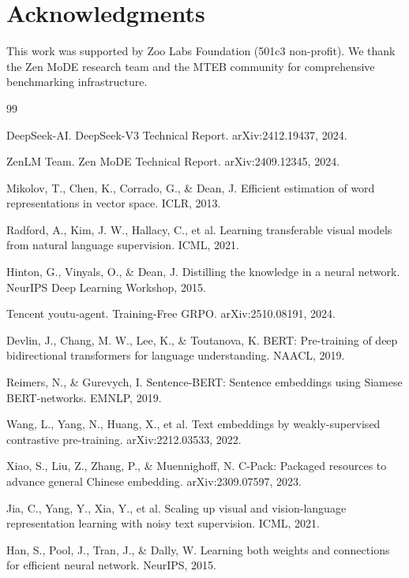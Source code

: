 \documentclass[11pt,letterpaper]{article}
\begin{document}
\section*{Acknowledgments}

This work was supported by Zoo Labs Foundation (501c3 non-profit). We thank the Zen MoDE research team and the MTEB community for comprehensive benchmarking infrastructure.

\begin{thebibliography}{99}

DeepSeek-AI. DeepSeek-V3 Technical Report. arXiv:2412.19437, 2024.

ZenLM Team. Zen MoDE Technical Report. arXiv:2409.12345, 2024.

Mikolov, T., Chen, K., Corrado, G., \& Dean, J. Efficient estimation of word representations in vector space. ICLR, 2013.

Radford, A., Kim, J. W., Hallacy, C., et al. Learning transferable visual models from natural language supervision. ICML, 2021.

Hinton, G., Vinyals, O., \& Dean, J. Distilling the knowledge in a neural network. NeurIPS Deep Learning Workshop, 2015.

Tencent youtu-agent. Training-Free GRPO. arXiv:2510.08191, 2024.

Devlin, J., Chang, M. W., Lee, K., \& Toutanova, K. BERT: Pre-training of deep bidirectional transformers for language understanding. NAACL, 2019.

Reimers, N., \& Gurevych, I. Sentence-BERT: Sentence embeddings using Siamese BERT-networks. EMNLP, 2019.

Wang, L., Yang, N., Huang, X., et al. Text embeddings by weakly-supervised contrastive pre-training. arXiv:2212.03533, 2022.

Xiao, S., Liu, Z., Zhang, P., \& Muennighoff, N. C-Pack: Packaged resources to advance general Chinese embedding. arXiv:2309.07597, 2023.

Jia, C., Yang, Y., Xia, Y., et al. Scaling up visual and vision-language representation learning with noisy text supervision. ICML, 2021.

Han, S., Pool, J., Tran, J., \& Dally, W. Learning both weights and connections for efficient neural network. NeurIPS, 2015.


\end{thebibliography}
\end{document}
